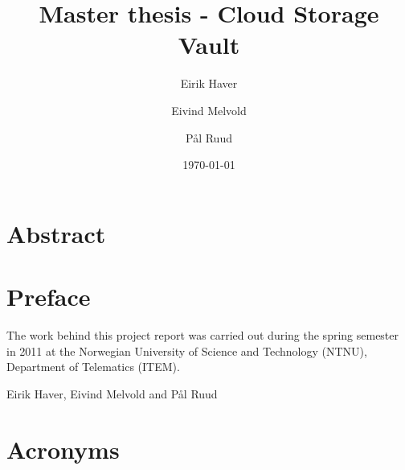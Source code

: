 \documentclass[english,12pt,a4paper]{book}
\author{Eirik Haver \and Eivind Melvold \and Pål Ruud}
\title{Master thesis - Cloud Storage Vault}
\date{\today}
\begin{document}

\pagestyle{empty}

\chapter*{Abstract}
\pagestyle{plain}
\setcounter{page}{1}

%

\chapter*{Preface}

The work behind this project report was carried out during the spring semester
in 2011 at the Norwegian University of Science and Technology (NTNU), Department
of Telematics (ITEM).
\vspace{13pt}

\begin{center}
Eirik Haver, Eivind Melvold and Pål Ruud
\vspace{13pt}

\end{center}

\tableofcontents

\cleardoublepage
{}
{}
\listoffigures

\cleardoublepage
{}
{}
\listoftables

\cleardoublepage
{}
{}
\lstlistoflistings
\cleardoublepage

\chapter*{Acronyms}
\end{document}
